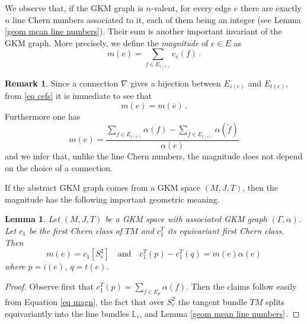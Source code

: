 \documentclass[12pt,a4paper]{amsart}
\theoremstyle{plain}
\newtheorem{lemma}[thm]{Lemma}
\theoremstyle{definition}
\newtheorem{rem}[thm]{Remark}
\begin{document}
We observe that, if the GKM graph is $n$-valent, for every edge $e$ there are exactly $n$ line Chern numbers associated to it, each of them
being an integer (see Lemma \ref{geom mean line numbers}). Their sum is another important invariant of the GKM graph. More precisely,
we define the \emph{magnitude} of $e\in E$ as
\begin{equation}\label{def magnitude}
m(e)=\sum_{f\in E_{i(e)}} c_e(f)\,.
\end{equation}
\begin{rem}
Since a connection $\nabla$ gives a bijection between $E_{i(e)}$ and $E_{t(e)}$, from \eqref{eq cefs} it is immediate to see that 
\begin{equation}\label{sym ms}
m(e)=m(\overline{e})\,.
\end{equation}
Furthermore one has
\begin{equation}\label{eq magn}
	m(e)=\frac{\sum_{f\in E_{i(e)}}\alpha(f)-\sum_{\widetilde{f}\in E_{t(e)}}\alpha(\widetilde{f})}{\alpha(e)}
\end{equation}
and we infer that, unlike the line Chern numbers, the magnitude does not depend on the choice of a connection.
\end{rem}
If the abstract GKM graph comes from a GKM space $(M,J,T)$, then the magnitude has the following important geometric meaning.
\begin{lemma}\label{magnitude and c1}
Let $(M,J,T)$ be a GKM space with associated GKM graph $(\Gamma,\alpha)$. Let $c_1$ be the first Chern class of $TM$ and $c_1^T$ its equivariant 
first Chern class. Then 
$$
m(e)=c_1[S^2_e]\quad\text{and}\quad c^T_1(p)-c^T_1(q)=m(e)\alpha(e)
$$  
where $p=i(e)$, $q=t(e)$.
\end{lemma}
\begin{proof}
Observe first that $c_1^T(p)=\displaystyle\sum_{f\in E_p}\alpha(f)$. Then the claims
follow easily from Equation \eqref{eq magn}, the fact that over $S^2_e$ the tangent bundle $TM$ splits equivariantly into the line bundles $\mathbb{L}_i$, and Lemma \ref{geom mean line numbers}\,.
\end{proof}
\end{document}
